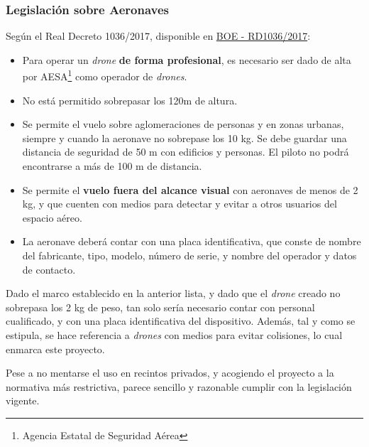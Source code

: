 \subsubsection{Legislación sobre Aeronaves}
\label{subsec:legislacion}
Según el Real Decreto 1036/2017, disponible en \href{https://www.seguridadaerea.gob.es/media/4629426/rd_1036_17_rpas.pdf}{BOE - RD1036/2017}:
\begin{itemize}
\item Para operar un \emph{drone} \textbf{de forma profesional}, es necesario ser dado de alta por AESA\footnote{Agencia Estatal de Seguridad Aérea} como operador de \emph{drones}.
\item No está permitido sobrepasar los 120m de altura.
\item Se permite el vuelo sobre aglomeraciones de personas y en zonas urbanas, siempre y cuando la aeronave no sobrepase los 10 kg. Se debe guardar una distancia de seguridad de 50 m con edificios y personas. El piloto no podrá encontrarse a más de 100 m de distancia.
\item Se permite el \textbf{vuelo fuera del alcance visual} con aeronaves de menos de 2 kg, y que cuenten con medios para detectar y evitar a otros usuarios del espacio aéreo. 
\item La aeronave deberá contar con una placa identificativa, que conste de nombre del fabricante, tipo, modelo, número de serie, y nombre del operador y datos de contacto.
\end{itemize}

Dado el marco establecido en la anterior lista, y dado que el \emph{drone} creado no sobrepasa los 2 kg de peso, tan solo sería necesario contar con personal cualificado, y con una placa identificativa del dispositivo. Además, tal y como se estipula, se hace referencia a \emph{drones} con medios para evitar colisiones, lo cual enmarca este proyecto. 

Pese a no mentarse el uso en recintos privados, y acogiendo el proyecto a la normativa más restrictiva, parece sencillo y razonable cumplir con la legislación vigente. 

